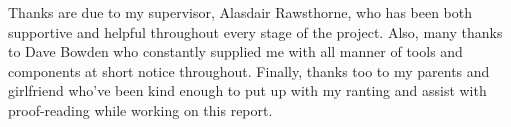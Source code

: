 Thanks are due to my supervisor, Alasdair Rawsthorne, who has been both
supportive and helpful throughout every stage of the project. Also, many thanks
to Dave Bowden who constantly supplied me with all manner of tools and
components at short notice throughout. Finally, thanks too to my parents and
girlfriend who've been kind enough to put up with my ranting and assist with
proof-reading while working on this report.
